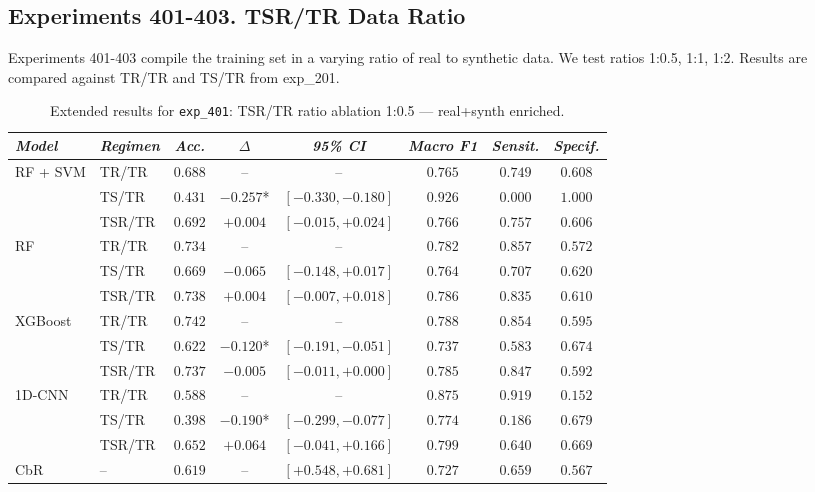 \newpage

\subsection*{Experiments 401-403. TSR/TR Data Ratio }
Experiments 401-403 compile the training set in a varying ratio of real to synthetic data. We test ratios 1:0.5, 1:1, 1:2. Results are compared against TR/TR and TS/TR from exp\_201. 

\begin{table}[H]
\centering
\scriptsize 
\caption{Extended results for \texttt{exp\_401}: TSR/TR ratio ablation 1:0.5 — real+synth enriched.}
\label{tab:appendix_exp_401}
\begin{tabular*}{\textwidth}{@{\extracolsep{\fill}}llcccccc}
\toprule
\emph{Model} & \emph{Regimen} & \emph{Acc.} & \emph{$\Delta$} & \emph{95\% CI} & \emph{Macro F1} & \emph{Sensit.} & \emph{Specif.}\\
\midrule
\multirow{3}{*}{RF + SVM} & TR/TR & $0.688$ & -- & -- & $0.765$ & $0.749$ & $0.608$\\
 & TS/TR & $0.431$ & $-0.257$* & $[-0.330, -0.180]$ & $0.926$ & $0.000$ & $1.000$\\
 & TSR/TR & $0.692$ & $+0.004$ & $[-0.015, +0.024]$ & $0.766$ & $0.757$ & $0.606$\\
\midrule
\multirow{3}{*}{RF} & TR/TR & $0.734$ & -- & -- & $0.782$ & $0.857$ & $0.572$\\
 & TS/TR & $0.669$ & $-0.065$ & $[-0.148, +0.017]$ & $0.764$ & $0.707$ & $0.620$\\
 & TSR/TR & $0.738$ & $+0.004$ & $[-0.007, +0.018]$ & $0.786$ & $0.835$ & $0.610$\\
\midrule
\multirow{3}{*}{XGBoost} & TR/TR & $0.742$ & -- & -- & $0.788$ & $0.854$ & $0.595$\\
 & TS/TR & $0.622$ & $-0.120$* & $[-0.191, -0.051]$ & $0.737$ & $0.583$ & $0.674$\\
 & TSR/TR & $0.737$ & $-0.005$ & $[-0.011, +0.000]$ & $0.785$ & $0.847$ & $0.592$\\
\midrule
\multirow{3}{*}{1D-CNN} & TR/TR & $0.588$ & -- & -- & $0.875$ & $0.919$ & $0.152$\\
 & TS/TR & $0.398$ & $-0.190$* & $[-0.299, -0.077]$ & $0.774$ & $0.186$ & $0.679$\\
 & TSR/TR & $0.652$ & $+0.064$ & $[-0.041, +0.166]$ & $0.799$ & $0.640$ & $0.669$\\
\midrule
CbR & -- & $0.619$ & -- & $[+0.548, +0.681]$ & $0.727$ & $0.659$ & $0.567$\\
\bottomrule
\end{tabular*}
\end{table}

